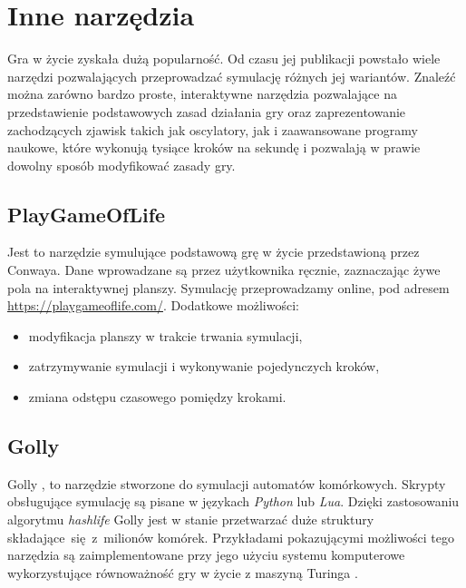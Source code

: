 \documentclass[declaration,shortabstract, inz]{iithesis}
\theoremstyle{definition} \newtheorem{definition}{Definicja}[]
\theoremstyle{plain} \newtheorem{remark}[definition]{Obserwacja}
\theoremstyle{plain} \newtheorem{theorem}[definition]{Twierdzenie}
\theoremstyle{plain} \newtheorem{example}{Przykład}[definition]
\theoremstyle{plain} \newtheorem{lemma}[definition]{Lemat}
\begin{document}
\chapter{Inne narzędzia}
\label{sec:tools}
Gra w życie zyskała dużą popularność. Od czasu jej publikacji powstało wiele narzędzi pozwalających przeprowadzać symulację różnych jej wariantów. Znaleźć można zarówno bardzo proste, interaktywne narzędzia pozwalające na przedstawienie podstawowych zasad działania gry oraz zaprezentowanie zachodzących zjawisk takich jak oscylatory, jak i zaawansowane programy naukowe, które wykonują tysiące kroków na sekundę i pozwalają w prawie dowolny sposób modyfikować zasady gry.
\section{PlayGameOfLife}
Jest to narzędzie symulujące podstawową grę w życie przedstawioną przez Conwaya. Dane wprowadzane są przez użytkownika ręcznie, zaznaczając żywe pola na interaktywnej planszy. Symulację przeprowadzamy online, pod adresem \url{https://playgameoflife.com/}. Dodatkowe możliwości:
\begin{itemize}
\item modyfikacja planszy w trakcie trwania symulacji,
\item zatrzymywanie symulacji i wykonywanie pojedynczych kroków,
\item zmiana odstępu czasowego pomiędzy krokami.
\end{itemize}

\section{Golly}
Golly \cite{golly}, to narzędzie stworzone do symulacji automatów komórkowych. Skrypty obsługujące symulację są pisane w językach \textit{Python} lub \textit{Lua}. Dzięki zastosowaniu algorytmu \textit{hashlife} \cite{hashlife} Golly jest w stanie przetwarzać duże struktury składające~się~z~milionów komórek. Przykładami pokazującymi możliwości tego narzędzia są zaimplementowane przy jego użyciu systemu komputerowe wykorzystujące równoważność gry w życie z maszyną Turinga \cite{rendell}.
\end{document}
